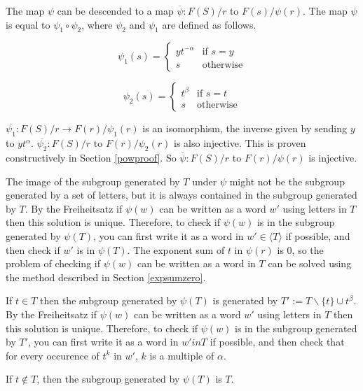 \documentclass[11pt]{article} %
\theoremstyle{definition}
\theoremstyle{definition}
\theoremstyle{definition}
\theoremstyle{definition}
\theoremstyle{definition}
\theoremstyle{definition}
\begin{document}
The map $\psi$ can be descended to a map $\overline{\psi} : F(S) / r$ to $F(s) / \psi(r)$. The map
$\psi$ is equal to $\psi_1 \circ \psi_2$,
where $\psi_2$ and $\psi_1$ are defined as follows.

\begin{equation}
  \psi_1(s) =
  \begin{cases}
     yt^{-\alpha} &\text{if } s = y \\
     s & \text{otherwise}
  \end{cases}
\end{equation}

\begin{equation}
  \psi_2(s) =
  \begin{cases}
     t^\beta & \text{if } s = t \\
     s & \text{otherwise}
  \end{cases}
\end{equation}

$\overline{\psi_1} : F(S) / r \to F(r) / \psi_1(r)$ is an isomorphism,
the inverse given by sending $y$ to $yt^\alpha$.
$\overline{\psi_2} : F(S) / r$ to $F(r) / \psi_2(r)$
is also injective.
This is proven constructively in Section \ref{powproof}.
So $\overline{\psi} : F(S) / r$ to $F(r) / \psi(r)$ is injective.

The image of the subgroup generated
by $T$ under $\psi$ might not be the subgroup generated by a set of letters, but it is
always contained in the subgroup generated by $T$.
By the Freiheitsatz if $\psi(w)$ can be written
as a word $w'$ using letters in $T$ then this solution is unique.
Therefore, to check if $\psi(w)$ is in the subgroup generated by
$\psi(T)$, you can first write it as a word in $w' \in \langle T \rangle$ if possible,
and then check if $w'$ is in $\psi(T)$.
The exponent sum of $t$ in $\psi(r)$ is $0$, so the problem of checking
if $\psi(w)$ can be written as a word in $T$ can be solved using
the method described in Section \ref{expsumzero}.

If $t \in T$ then the subgroup generated by $\psi(T)$ is generated by
$T' := T \backslash \{t\} \cup t^\beta$. By the Freiheitsatz if $\psi(w)$ can be written
as a word $w'$ using letters in $T$ then this solution is unique. Therefore,
to check if $\psi(w)$ is in the subgroup generated by $T'$, you can first
write it as a word in $w' in T$ if possible, and then check that for every
occurence of $t^k$ in $w'$, $k$ is a multiple of $\alpha$.

If $t \notin T$, then the subgroup generated by $\psi(T)$ is $T$.
\end{document}
